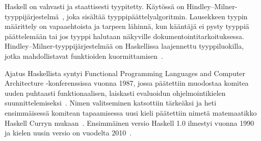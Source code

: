 \documentclass[english, finnish]{tktltiki2}
\theoremstyle{definition}
\theoremstyle{remark}
\begin{document}
Haskell on vahvasti ja staattisesti tyypitetty. Käytössä on Hindley--Milner-tyyppijärjestelmä~\cite[luku~4.1]{Mar10}, joka sisältää tyyppipäättelyalgoritmin. Lausekkeen tyypin määrittely on vapaaehtoista ja tarpeen lähinnä, kun kääntäjä ei pysty tyyppiä päättelemään tai jos tyyppi halutaan näkyville dokumentointitarkoituksessa. Hindley--Milner-tyyppijärjestelmää on Haskellissa laajennettu tyyppiluokilla, jotka mahdollistavat funktioiden kuormittamisen~\cite[luku~4.1]{Mar10}.

Ajatus Haskellista syntyi \foreignlanguage{english}{Functional Programming Languages and Computer Architecture} -konferenssissa vuonna 1987, jossa päätettiin muodostaa komitea uuden puhtaasti funktionaalisen, laiskasti evaluoidun ohjelmointikielen suunnittelemiseksi~\cite[s.~12-1]{Hud07}. Nimen valitseminen katsottiin tärkeäksi ja heti ensimmäisessä komitean tapaamisessa uusi kieli päätettiin nimetä matemaatikko Haskell Curryn mukaan~\cite[s.~12-4]{Hud07}.  Ensimmäinen versio Haskell 1.0 ilmestyi vuonna 1990~\cite{HW90} ja kielen uusin versio on vuodelta 2010~\cite{Mar10}.

%
%
% 
%







% 
\end{document}
